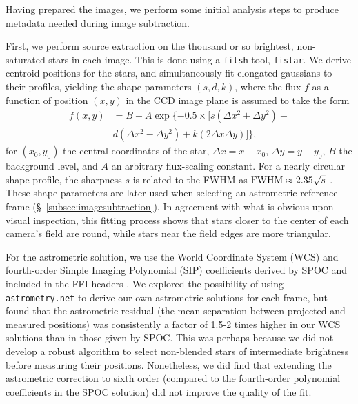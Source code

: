 \documentclass[12pt,twocolumn,tighten]{aastex62}
\begin{document}
Having prepared the images, we perform some initial analysis steps to
produce metadata needed during image subtraction.  

First, we perform source extraction on the
thousand or so brightest, non-saturated stars in each image.  
This is done using a \texttt{fitsh} tool, \texttt{fistar}.
We derive centroid positions for the stars, and
simultaneously
fit elongated gaussians to their profiles, yielding the shape
parameters $(s,d,k)$, where the flux $f$ as a function of position
$(x,y)$ in the CCD image plane is assumed to take the form
\begin{align}
  f(x,y) &= B + A \exp \{ -0.5 \times [
    s(\Delta x^2 + \Delta y^2) + \\
    \nonumber
    &d(\Delta x^2 - \Delta y^2) +
    k(2\Delta x \Delta y)
  ]  \},
\end{align}
for $(x_0,y_0)$ the central coordinates of the star,
$\Delta x = x-x_0$, $\Delta y = y - y_0$, $B$ the background
level, and $A$ an arbitrary
flux-scaling constant.
For a nearly circular shape profile, the sharpness $s$ is related to
the FWHM as ${\rm FWHM} \approx 2.35\sqrt{s}$ \citep[{\it
e.g.},][]{Pal_2009}.  These shape parameters are later used when
selecting an astrometric reference frame
(\S~\ref{subsec:imagesubtraction}).  
In agreement with what is obvious upon visual inspection, this 
fitting process shows that stars closer to the
center of each camera's field are round, while
stars near the field edges are more triangular.

For the astrometric solution, we use the World Coordinate System (WCS)
and fourth-order Simple Imaging Polynomial (SIP) coefficients
derived by SPOC and included in the FFI headers
\citep[][Sec.~8]{pence_fits_2010}.  We explored the possibility of
using \texttt{astrometry.net} \citep{lang_2010} to derive our own
astrometric solutions for each frame, but found that the astrometric
residual (the mean separation between projected and measured
positions) was consistently a factor of 1.5-2 times higher in our WCS
solutions than in those given by SPOC.  This was perhaps because
we did not develop a robust
algorithm to select non-blended stars of intermediate brightness before
measuring their positions.
Nonetheless, we did find that extending the astrometric correction
to sixth order (compared to the fourth-order polynomial coefficients
in the SPOC solution) did not improve the quality of the fit. 
\end{document}
